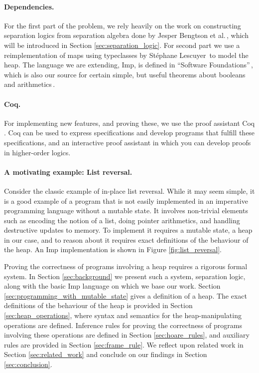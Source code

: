 \paragraph{Dependencies.}
For the first part of the problem, we rely heavily on the work on constructing separation logics from separation algebra done by Jesper Bengtson et al.\,\cite{BirkedalL:veroop-conf}, which will be introduced in Section \ref{sec:separation_logic}. For second part we use a reimplementation of maps using typeclasses by Stéphane Lescuyer\,\cite{CoqContainers} to model the heap. The language we are extending, Imp, is defined in ``Software Foundations''\,\cite{Pierce:SF}, which is also our source for certain simple, but useful theorems about booleans and arithmetics\,\cite{SfLib}.

\paragraph{Coq.}
For implementing new features, and proving these, we use the proof assistant Coq \cite{CoqIntro}. Coq can be used to express specifications and develop programs that fulfill these specifications, and an interactive proof assistant in which you can develop proofs in higher-order logics.

\paragraph{A motivating example: List reversal.}
Consider the classic example of in-place list reversal. While it may seem simple, it is a good example of a program that is not easily implemented in an imperative programming language without a mutable state. It involves non-trivial elements such as encoding the notion of a list, doing pointer arithmetics, and handling destructive updates to memory. To implement it requires a mutable state, a heap in our case, and to reason about it requires exact definitions of the behaviour of the heap. An Imp implementation is shown in Figure \ref{fig:list_reversal}.

Proving the correctness of programs involving a heap requires a rigorous formal system. In Section \ref{sec:background} we present such a system, separation logic, along with the basic Imp language on which we base our work. Section \ref{sec:programming_with_mutable_state} gives a definition of a heap. The exact definitions of the behaviour of the heap is provided in Section \ref{sec:heap_operations}, where syntax and semantics for the heap-manipulating operations are defined. Inference rules for proving the correctness of programs involving these operations are defined in Section \ref{sec:hoare_rules}, and auxiliary rules are provided in Section \ref{sec:frame_rule}. We reflect upon related work in Section \ref{sec:related_work} and conclude on our findings in Section \ref{sec:conclusion}.


